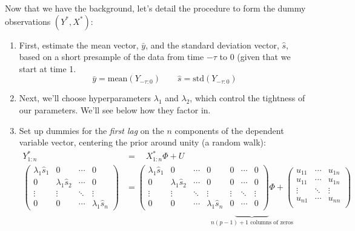 \documentclass[a4paper,12pt]{scrartcl}
\begin{document}
Now that we have the background, let's detail the procedure
to form the dummy observations $( Y^*, X^*)$:
\begin{enumerate}
    \item First, estimate the mean vector, $\bar{y}$, and the
	standard deviation vector, $\hat{s}$, based on
	a short presample of the data from time 
	$-\tau$ to 0 (given that we start at time 1.
	\[ \bar{y} = \text{mean}\left(Y_{-\tau:0}\right)
	    \qquad \hat{s} = \text{std}\left(Y_{-\tau:0}\right)
	    \]
    \item Next, we'll choose hyperparameters $\lambda_1$ and
	$\lambda_2$, which control the tightness of our
	parameters. We'll see below how they factor in.
    \item Set up dummies for the \emph{first lag} on the $n$ 
	components of the dependent variable vector, 
	centering the prior around unity (a random walk):
	\begin{align*}
	    Y^*_{1:n} \quad &= \quad X^*_{1:n} \Phi + U \\
	    \begin{pmatrix} \lambda_1 \hat{s}_1 
		    & 0 & \cdots & 0 \\ 
		0 & \lambda_1 \hat{s}_2 & \cdots & 0 \\ 
		\vdots & \vdots & \ddots & \vdots \\
		0 & 0 & \cdots & 
		\lambda_1 \hat{s}_n \end{pmatrix} &= 
	    \begin{pmatrix} \lambda_1 \hat{s}_1 & 0 & \cdots &
		0 & 0 & \cdots & 0 \\
		0 & \lambda_1 \hat{s}_2 & \cdots & 0 & 0 &
		\cdots & 0 \\
		\vdots & \vdots & \ddots & \vdots & \vdots & 
		\ddots & \vdots \\
		0 & 0 & \cdots & \lambda_1 \hat{s}_n & 
		0 & \cdots &  0 
	    \end{pmatrix} \Phi + 
	    \begin{pmatrix}
		u_{11} & \cdots & u_{1n} \\
		u_{11} & \cdots & u_{1n} \\
		\vdots  & \ddots & \vdots \\
		u_{n1} & \cdots & u_{nn} \\
	    \end{pmatrix}  \\
	    & \qquad \qquad \qquad \qquad \qquad 
	    \underbrace{\qquad\qquad}_{
		\text{$n(p-1) +1$ columns of zeros}}
	\end{align*}


\end{enumerate}
\end{document}

